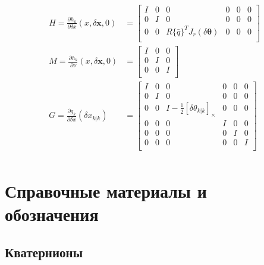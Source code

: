 \documentclass[12pt]{article}
\begin{document}
\begin{equation}
\begin{aligned}
        H=\frac{\partial h_k}{\partial \delta x}(x,\delta\pmb{x}, 0)
         & =\begin{bmatrix}
            I & 0 & 0                                      & 0 & 0 & 0 \\
            0 & I & 0                                      & 0 & 0 & 0 \\
            0 & 0 & R\{\bar{q}\}^T J_r(\delta\pmb{\theta}) & 0 & 0 & 0 \\
        \end{bmatrix} \\
        M=\frac{\partial h_k}{\partial \nu}(x,\delta\pmb{x}, 0)
         & =\begin{bmatrix}
            I & 0 & 0 \\
            0 & I & 0 \\
            0 & 0 & I \\
        \end{bmatrix} \\
        G=\frac{\partial g_k}{\partial \delta x}(\delta x_{k|k})
         & =\begin{bmatrix}
            I & 0 & 0                                          & 0 & 0 & 0 \\
            0 & I & 0                                          & 0 & 0 & 0 \\
            0 & 0 & I - \frac{1}{2}[\delta\theta_{k|k}]_\times & 0 & 0 & 0 \\
            0 & 0 & 0                                          & I & 0 & 0 \\
            0 & 0 & 0                                          & 0 & I & 0 \\
            0 & 0 & 0                                          & 0 & 0 & I \\
        \end{bmatrix} \\
    \end{aligned}
\end{equation}


\section{Справочные материалы и обозначения}
\label{SectionAppendix}

\subsection{Кватернионы}
\label{SubsectionQuaternions}
\end{document}
